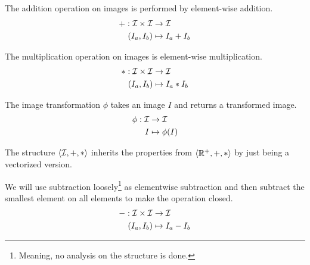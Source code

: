 \begin{definition}
  The addition operation on images is performed by element-wise
  addition.
  \begin{equation}
    \begin{split}
      + : \mathcal{I} \times \mathcal{I} &\rightarrow \mathcal{I}\\
      (I_a,I_b) &\mapsto I_a+I_b
    \end{split}
  \end{equation}
\end{definition}

\begin{definition}
  The multiplication operation on images is element-wise
  multiplication.
  \begin{equation}
    \begin{split}
      * : \mathcal{I} \times \mathcal{I} &\rightarrow \mathcal{I}\\
      (I_a,I_b) &\mapsto I_a*I_b
    \end{split}
  \end{equation}
\end{definition}

\begin{definition}
  The image transformation $\phi$ takes an image $I$ and returns a
  transformed image.
  \begin{equation}
    \begin{split}
      \phi : \mathcal{I} &\rightarrow \mathcal{I}\\
      I &\mapsto \phi(I)
    \end{split}
  \end{equation}
\end{definition}

The structure $\langle \mathcal{I},+,*\rangle$ inherits the properties from
$\langle \mathbb{R}^+,+,*\rangle$ by just being a vectorized version.

\begin{definition}
  We will use subtraction loosely\footnote{Meaning, no analysis on the
    structure is done.} as elementwise subtraction and then subtract
  the smallest element on all elements to make the operation closed.
  \begin{equation}
    \begin{split}
      - : \mathcal{I} \times \mathcal{I} &\rightarrow \mathcal{I}\\
      (I_a,I_b) &\mapsto I_a-I_b
    \end{split}
  \end{equation}
\end{definition}


